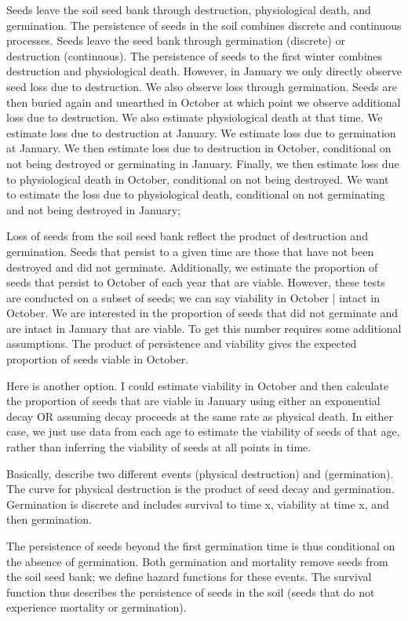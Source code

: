 \documentclass[12pt, oneside, titlepage]{article}   	%
\begin{document}
Seeds leave the soil seed bank through destruction, physiological death, and germination. The persistence of seeds in the soil combines discrete and continuous processes. Seeds leave the seed bank through germination (discrete) or destruction (continuous). The persistence of seeds to the first winter combines destruction and physiological death. However, in January we only directly observe seed loss due to destruction. We also observe loss through germination. Seeds are then buried again and unearthed in October at which point we observe additional loss due to destruction. We also estimate physiological death at that time. We estimate loss due to destruction at January. We estimate loss due to germination at January. We then estimate loss due to destruction in October, conditional on not being destroyed or germinating in January. Finally, we then estimate loss due to physiological death in October, conditional on not being destroyed. We want to estimate the loss due to physiological death, conditional on not germinating and not being destroyed in January;

Loss of seeds from the soil seed bank reflect the product of destruction and germination. Seeds that persist to a given time are those that have not been destroyed and did not germinate. Additionally, we estimate the proportion of seeds that persist to October of each year that are viable. However, these tests are conducted on a subset of seeds; we can say viability in October | intact in October. We are interested in the proportion of seeds that did not germinate and are intact in January that are viable. To get this number requires some additional assumptions. The product of persistence and viability gives the expected proportion of seeds viable in October. 

Here is another option. I could estimate viability in October and then calculate the proportion of seeds that are viable in January using either an exponential decay OR assuming decay proceeds at the same rate as physical death. In either case, we just use data from each age to estimate the viability of seeds of that age, rather than inferring the viability of seeds at all points in time. 

Basically, describe two different events (physical destruction) and (germination). The curve for physical destruction is the product of seed decay and germination. Germination is discrete and includes survival to time x, viability at time x, and then germination. 

The persistence of seeds beyond the first germination time is thus conditional on the absence of germination. Both germination and mortality remove seeds from the soil seed bank; we define hazard functions for these events. The survival function thus describes the persistence of seeds in the soil (seeds that do not experience mortality or germination).
\end{document}
